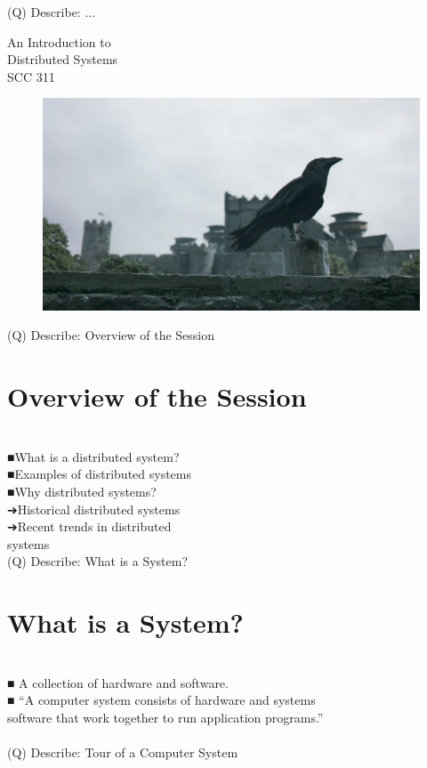 \documentclass[12pt]{article}
\begin{document}
(Q)
Describe: ...
\clearpage

An Introduction to \\
Distributed Systems\\
SCC 311\\
\begin{figure}[H]
\includegraphics[width=0.5\linewidth]{page1-image-1.png}
\end{figure}
\clearpage
(Q)
Describe: Overview of the Session
\clearpage
\section{Overview of the Session}
\\
■What is a distributed system?\\
■Examples of distributed systems\\
■Why distributed systems?\\
➔Historical distributed systems\\
➔Recent trends in distributed \\
systems\\
\clearpage
(Q)
Describe: What is a System?
\clearpage
\section{What is a System?}
\\
■ A collection of hardware and software.\\
■ “A computer system consists of hardware and systems \\
software that work together to run application programs.”\\
[Bryant and O'Hallaron]\\
\clearpage
(Q)
Describe: Tour of a Computer System
\clearpage
\end{document}
